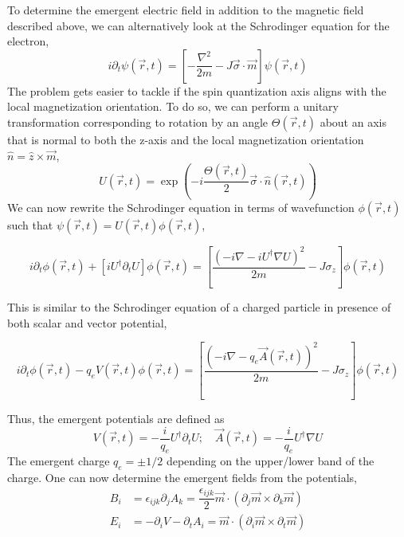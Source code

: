 \documentclass[aps,prb,onecolumn,notitlepage,showpacs,floatfix,superscriptaddress]{revtex4-1}
\begin{document}
\noindent To determine the emergent electric field in addition to the magnetic field described above, we can alternatively look at the Schrodinger equation for the electron,
\begin{equation}
i \partial_t \psi(\vec{r},t) = \left[-\dfrac{\nabla^2}{2m} - J \vec{\sigma} \cdot \vec{m} \right] \psi(\vec{r},t)
\end{equation}
The problem gets easier to tackle if the spin quantization axis aligns with the local magnetization orientation. To do so, we can perform a unitary transformation corresponding to rotation by an angle $\Theta(\vec{r},t)$ about an axis that is normal to both the z-axis and the local magnetization orientation $\hat{n} = \hat{z} \times \vec{m}$,
\begin{equation}
U(\vec{r},t) = \exp\left( -i \dfrac{\Theta(\vec{r},t)}{2} \vec{\sigma} \cdot \hat{n}(\vec{r},t)\right)
\end{equation}
We can now rewrite the Schrodinger equation in terms of wavefunction $\phi(\vec{r},t)$ such that $\psi(\vec{r},t) = U(\vec{r},t) \phi(\vec{r},t)$,
\begin{widetext}
\begin{equation}
i \partial_t \phi(\vec{r},t) + [iU^\dagger \partial_t U] \phi(\vec{r},t) = \left[\dfrac{(-i\nabla - i U^\dagger \nabla U)^2}{2m} - J \sigma_z \right] \phi(\vec{r},t)
\end{equation}
\end{widetext}
This is similar to the Schrodinger equation of a charged particle in presence of both scalar and vector potential,
\begin{widetext}
\begin{equation}
i \partial_t \phi(\vec{r},t) - q_e V(\vec{r},t) \phi(\vec{r},t) = \left[\dfrac{(-i\nabla - q_e \vec{A}(\vec{r},t))^2}{2m} - J \sigma_z \right] \phi(\vec{r},t)
\end{equation}
\end{widetext}
Thus, the emergent potentials are defined as
\begin{equation}
V(\vec{r},t) = -\dfrac{i}{q_e} U^\dagger \partial_t U; \quad \vec{A}(\vec{r},t) = -\dfrac{i}{q_e} U^\dagger \nabla U  
\end{equation}
The emergent charge $q_e = \pm 1/2$ depending on the upper/lower band of the charge. One can now determine the emergent fields from the potentials,
\begin{equation}
\begin{split}
B_i &= \epsilon_{ijk} \partial_j A_k = \dfrac{\epsilon_{ijk}}{2} \vec{m} \cdot (\partial_j \vec{m} \times \partial_k \vec{m}) \\
E_i &= -\partial_i V - \partial_t A_i = \vec{m} \cdot (\partial_i \vec{m} \times \partial_t \vec{m}) \\
\end{split}
\end{equation}
\end{document}
